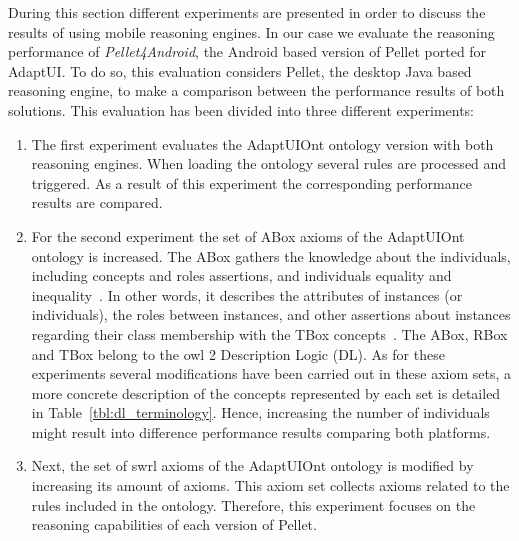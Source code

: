 During this section different experiments are presented in order to 
discuss the results of using mobile reasoning engines. In our case we evaluate 
the reasoning performance of \textit{Pellet4Android}, the Android based version 
of Pellet ported for AdaptUI. To do so, this evaluation considers Pellet, the 
desktop Java based reasoning engine, to make a comparison between the 
performance results of both solutions. This evaluation has been divided into 
three different experiments:

\begin{enumerate}
  \item The first experiment evaluates the AdaptUIOnt ontology version with both 
  reasoning engines. When loading the ontology several rules are processed and 
  triggered. As a result of this experiment the corresponding performance 
  results are compared.
  
  \item For the second experiment the set of ABox axioms of the AdaptUIOnt 
  ontology is increased. The ABox gathers the knowledge about the 
  individuals, including concepts and roles assertions, and individuals 
  equality and inequality~\citep{krotzsch_description_2012}. In other words, 
  it describes the attributes of instances (or individuals), the roles between 
  instances, and other assertions about instances regarding their class 
  membership with the TBox concepts~\citep{abox_tbox}. The ABox, RBox and TBox 
  belong to the \ac{owl} 2 Description Logic (DL). As for these experiments several 
  modifications have been carried out in these axiom sets, a more concrete 
  description of the concepts represented by each set is detailed in 
  Table~\ref{tbl:dl_terminology}. Hence, increasing the number of individuals   
  might result into difference performance results comparing both platforms.
  
  \item Next, the set of \ac{swrl} axioms of the AdaptUIOnt ontology is modified 
  by increasing its amount of axioms. This axiom set collects axioms related to 
  the rules included in the ontology. Therefore, this experiment focuses on the 
  reasoning capabilities of each version of Pellet.
\end{enumerate}



